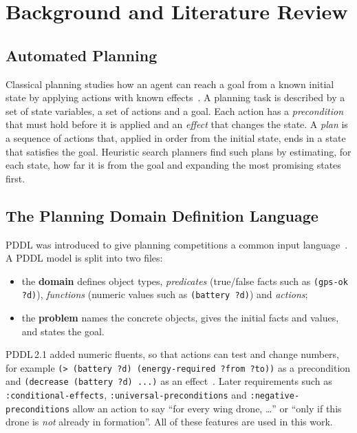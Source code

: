 \documentclass[11pt,a4paper,oneside]{report}
\newcommand{\code}[1]{\texttt{#1}}
\begin{document}
\chapter{Background and Literature Review}\label{ch:background}

\section{Automated Planning}
Classical planning studies how an agent can reach a goal from a known initial state by applying
actions with known effects~\cite{ghallab2004automated}. A planning task is described by a set of
state variables, a set of actions and a goal. Each action has a \emph{precondition} that must
hold before it is applied and an \emph{effect} that changes the state. A \emph{plan} is a sequence
of actions that, applied in order from the initial state, ends in a state that satisfies the
goal. Heuristic search planners find such plans by estimating, for each state, how far it is
from the goal and expanding the most promising states first.

\section{The Planning Domain Definition Language}
PDDL was introduced to give planning competitions a common input
language~\cite{mcdermott1998pddl}. A PDDL model is split into two files:
\begin{itemize}
  \item the \textbf{domain} defines object types, \emph{predicates} (true/false facts such as
        \code{(gps-ok ?d)}), \emph{functions} (numeric values such as \code{(battery ?d)}) and
        \emph{actions};
  \item the \textbf{problem} names the concrete objects, gives the initial facts and values, and
        states the goal.
\end{itemize}
PDDL\,2.1 added numeric fluents, so that actions can test and change numbers, for example
\code{(> (battery ?d) (energy-required ?from ?to))} as a precondition and
\code{(decrease (battery ?d) ...)} as an effect~\cite{fox2003pddl21}. Later requirements such as
\code{:conditional-effects}, \code{:universal-preconditions} and \code{:negative-preconditions}
allow an action to say ``for every wing drone, \ldots'' or ``only if this drone is \emph{not}
already in formation''. All of these features are used in this work.
\end{document}
